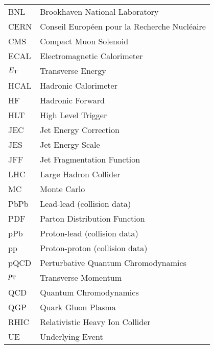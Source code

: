 
\begin{table}[htbp]

\begin{tabular}{l l}

BNL & Brookhaven National Laboratory\\

CERN & Conseil Europ\'{e}en pour la Recherche Nucl\'{e}aire\\

CMS & Compact Muon Solenoid \\

ECAL & Electromagnetic Calorimeter\\

$E_{\rm T}$ & Transverse Energy\\

HCAL & Hadronic Calorimeter\\

HF & Hadronic Forward\\

HLT & High Level Trigger \\ 

JEC & Jet Energy Correction\\

JES & Jet Energy Scale\\

JFF  & Jet Fragmentation Function \\

LHC & Large Hadron Collider \\

MC & Monte Carlo\\

PbPb & Lead-lead (collision data)\\

PDF & Parton Distribution Function\\

pPb & Proton-lead (collision data)\\

pp & Proton-proton (collision data)\\

pQCD & Perturbative Quantum Chromodynamics\\

$p_{\rm T}$ & Transverse Momentum\\

QCD & Quantum Chromodynamics\\

QGP  &  Quark Gluon Plasma \\

RHIC & Relativistic Heavy Ion Collider\\

UE & Underlying Event \\

\end{tabular}

\end{table}
